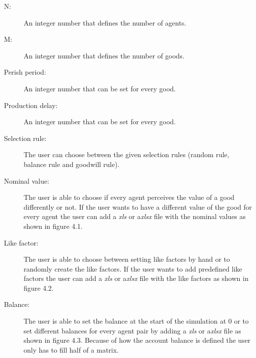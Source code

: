 \documentclass[twoside,openright]{uva-bachelor-thesis}
\begin{document}
\begin{description}
\item[N:] An integer number that defines the number of agents.
\item[M:] An integer number that defines the number of goods.
\item[Perish period:] An integer number that can be set for every good.
\item[Production delay:] An integer number that can be set for every good.
\item[Selection rule:] The user can choose between the given selection rules (random rule, balance rule and goodwill rule). 
\item[Nominal value:] The user is able to choose if every agent perceives the value of a good differently or not. If the user wants to have a different value of the good for every agent the user can add a \textit{xls} or a\textit{xlsx} file with the nominal values as shown in figure 4.1.
\item[Like factor:] The user is able to choose between setting like factors by hand or to randomly create the like factors. If the user wants to add predefined like factors the user can add a \textit{xls} or a\textit{xlsx} file with the like factors as shown in figure 4.2.
\item[Balance:] The user is able to set the balance at the start of the simulation at 0 or to set different balances for every agent pair by adding a \textit{xls} or a\textit{xlsx} file as shown in figure 4.3. Because of how the account balance is defined the user only has to fill half of a matrix.
\end{description}
\end{document}
